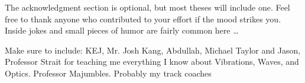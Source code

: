 
The acknowledgment section is optional, but most theses will include one.  Feel free to thank anyone who contributed to your effort if the mood strikes you.  Inside jokes and small pieces of humor are fairly common here \ldots

Make sure to include:
KEJ, Mr. Josh Kang, Abdullah, Michael Taylor and Jason, Professor Strait for teaching me everything I know about Vibrations, Waves, and Optics.  
Professor Majumbles. Probably my track coaches 

